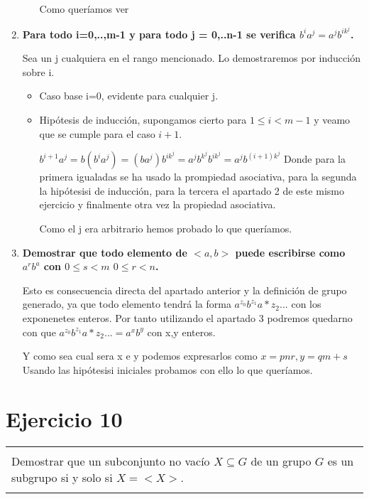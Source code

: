 \documentclass[12pt]{article}
\newenvironment{micaja}
{
    \begin{center}
    \begin{tabular}{|p{0.9\textwidth}|}
    \hline\\
    }   
    {   
    \\\\\hline
    \end{tabular} 
    \end{center}
    }
\begin{document}
\begin{enumerate}
\begin{itemize}
        Como queríamos ver 
        
    \end{itemize}  


    \item \textbf{Para todo i=0,..,m-1 y para todo j = 0,..n-1 se verifica $b^ia^j = a^j b^{i k ^j}$.}
    
    Sea un j cualquiera en el rango mencionado. 
    Lo demostraremos por inducción sobre i. 

    \begin{itemize}
        \item Caso base i=0, evidente para cualquier j. 
        \item Hipótesis de inducción, supongamos cierto para  $1\leq i < m-1$ y veamo que se cumple para el caso $i+1$. 
        
        $b^{i+1} a^{j} =  b (b^i a^j) = (b a^j) b^{i k^j} = a^j b^{k^j} b^{i k^j} = a^j b^{(i+1) k^j}$
        Donde para la primera igualadas se ha usado la prompiedad asociativa, para la segunda la hipótesisi de inducción, para la tercera el apartado 2 
        de este mismo ejercicio y finalmente otra vez la propiedad asociativa. 

        Como el j era arbitrario hemos probado lo que queríamos. 
    \end{itemize}


    \item \textbf{Demostrar que todo elemento de $<a,b>$ puede escribirse como $a^rb^a$ con $0 \leq s <m$ $0 \leq r <n$.}
    
    Esto es consecuencia directa del apartado anterior y la definición de grupo generado, ya que todo elemento tendrá la forma $a^{z_0} b^{z_1}a*{z_2}...$ con 
    los exponenetes enteros. Por tanto utilizando el apartado 3 podremos quedarno con que  $a^{z_0} b^{z_1}a*{z_2}... = a^x b^y$ con x,y enteros. 

    Y como sea cual sera x e y podemos expresarlos como $ x = pn r, y = qm +s $
    Usando las hipótesisi iniciales probamos con ello lo que queríamos. 


\end{enumerate}
\newpage

\section[Ejercicio 10]{Ejercicio 10 }
\begin{micaja}
Demostrar que un subconjunto no vacío $X \subseteq G$ de un grupo $G$ es un subgrupo si y solo si $X = <X>$.
\end{micaja}
\end{document}
